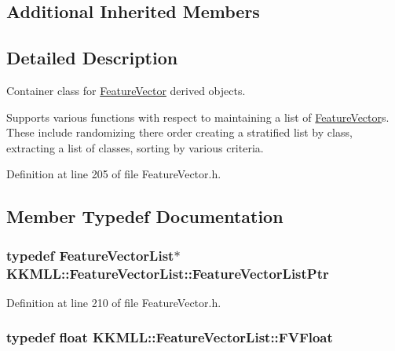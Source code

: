 \subsection*{Additional Inherited Members}


\subsection{Detailed Description}
Container class for \hyperlink{class_k_k_m_l_l_1_1_feature_vector}{Feature\+Vector} derived objects. 

Supports various functions with respect to maintaining a list of \hyperlink{class_k_k_m_l_l_1_1_feature_vector}{Feature\+Vector}\textquotesingle{}s. These include randomizing there order creating a stratified list by class, extracting a list of classes, sorting by various criteria. 

Definition at line 205 of file Feature\+Vector.\+h.



\subsection{Member Typedef Documentation}
\subsubsection[{\texorpdfstring{Feature\+Vector\+List\+Ptr}{FeatureVectorListPtr}}]{\setlength{\rightskip}{0pt plus 5cm}typedef {\bf Feature\+Vector\+List}$\ast$ {\bf K\+K\+M\+L\+L\+::\+Feature\+Vector\+List\+::\+Feature\+Vector\+List\+Ptr}}\hypertarget{class_k_k_m_l_l_1_1_feature_vector_list_af22f34b214e0dd3b16760002ce392355}{}\label{class_k_k_m_l_l_1_1_feature_vector_list_af22f34b214e0dd3b16760002ce392355}


Definition at line 210 of file Feature\+Vector.\+h.

\subsubsection[{\texorpdfstring{F\+V\+Float}{FVFloat}}]{\setlength{\rightskip}{0pt plus 5cm}typedef float {\bf K\+K\+M\+L\+L\+::\+Feature\+Vector\+List\+::\+F\+V\+Float}}\hypertarget{class_k_k_m_l_l_1_1_feature_vector_list_a91983a1c7d8e4a92a39ef7494909f75b}{}\label{class_k_k_m_l_l_1_1_feature_vector_list_a91983a1c7d8e4a92a39ef7494909f75b}


